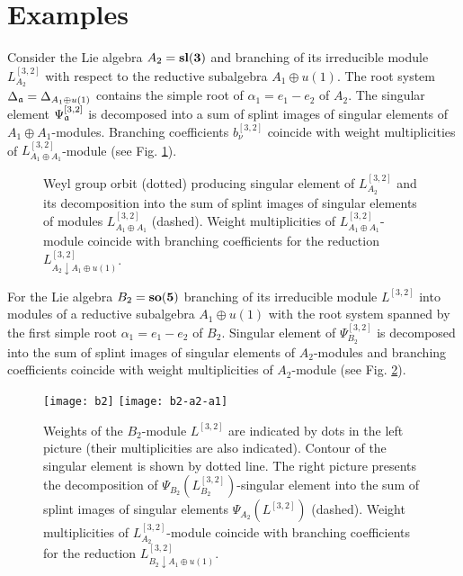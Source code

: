 \section{Examples}
\label{sec:examples}
\begin{example}
  Consider the Lie algebra $A_{2} =\bf{sl}(3)$ and branching of its irreducible module $L^{[3,2]}_{A_{2}}$ with respect to the reductive subalgebra $A_{1}\oplus u(1)$. The root system  $\Delta _{\frak{a}}= \Delta_{A_{1}\oplus u(1)}$ contains the simple root of $\alpha_1=e_1-e_2$ of $A_{2}$. The singular element $\Psi^{[3,2]}_{\frak{a}}$ is decomposed into a sum of splint images of singular elements of $A_{1}\oplus A_{1}$-modules. Branching coefficients $b_{\nu }^{[ 3,2 ] }$ coincide with weight multiplicities of $L^{[3,2]}_{A_{1}\oplus A_{1}}$-module (see Fig. \ref{fig:a2_splint}).

  \begin{figure}[h!bt]
  \noindent\centering{
   \texttt{[image: a2-a1]}
  }
  \caption{Weyl group orbit (dotted) producing singular element of $L^{[3,2]}_{A_{2}}$ and its decomposition into the sum of splint images of singular elements of modules  $L^{[3,2]}_{A_{1}\oplus A_{1}}$ (dashed). Weight multiplicities of $L^{[3,2]}_{A_{1}\oplus A_{1}}$-module coincide with branching coefficients for the reduction $L^{[3,2]}_{A_{2}\downarrow A_{1}\oplus u(1)}$.}

 \label{fig:a2_splint}
\end{figure}
\end{example}
\begin{example}
  For the Lie algebra $B_{2}= \bf{so}(5)$ branching of its irreducible module $L^{[3,2]}$ into  modules of a reductive subalgebra $A_{1}\oplus u(1)$ with the root system spanned by the first simple root $\alpha_1=e_1-e_2$ of $B_{2}$. Singular element of $\Psi^{[3,2]}_{B_{2}}$ is decomposed into the sum of splint images of singular elements of $A_{2}$-modules and branching coefficients coincide with weight multiplicities of $A_{2}$-module (see Fig. \ref{fig:b2_splint}).

  \begin{figure}[h!bt]
  \hspace*{-1.2cm}

   \texttt{[image: b2]}
   \texttt{[image: b2-a2-a1]}
  \caption{Weights of the $B_{2}$-module $L^{[3,2]}$ are indicated by dots in the left picture (their multiplicities are also indicated). Contour of the singular element is shown by dotted line. The right picture presents the decomposition of  $\Psi_{B_{2}}(L^{[3,2]}_{B_{2}})$-singular element into the sum of splint images of singular elements $\Psi_{A_{2}}(L^{[3,2]})$ (dashed). Weight multiplicities of $L^{[3,2]}_{A_{2}}$-module coincide with branching coefficients for the reduction $L^{[3,2]}_{B_{2}\downarrow A_{1}\oplus u(1)}$.}

 \label{fig:b2_splint}
\end{figure}
\end{example}

